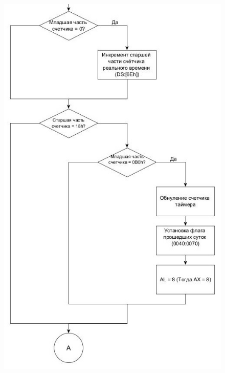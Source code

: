\clearpage
\newpage

\begin{figure}[!ht]
    \begin{center}
        \includegraphics[width=12cm]{img/int8h.1.2}
    \end{center}
\end{figure}

\clearpage
\newpage

